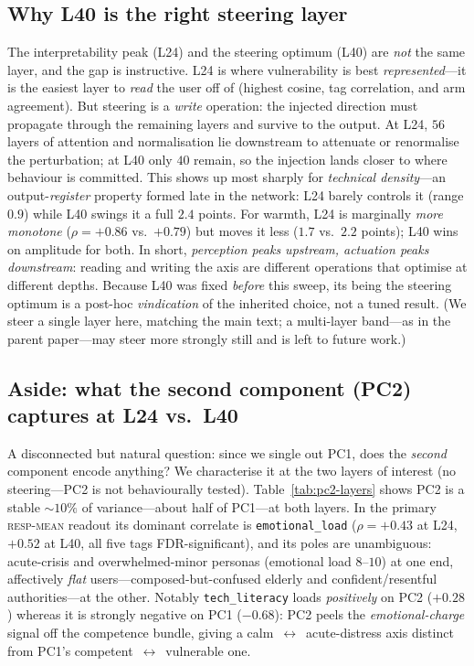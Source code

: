 \documentclass{article}
\newcommand{\respmean}{\textsc{resp-mean}}
\begin{document}
\subsection*{Why L40 is the right steering layer}
The interpretability peak (L24) and the steering optimum (L40) are \emph{not} the
same layer, and the gap is instructive. L24 is where vulnerability is best
\emph{represented}---it is the easiest layer to \emph{read} the user off of (highest
cosine, tag correlation, and arm agreement). But steering is a \emph{write}
operation: the injected direction must propagate through the remaining layers and
survive to the output. At L24, $56$ layers of attention and normalisation lie
downstream to attenuate or renormalise the perturbation; at L40 only $40$ remain, so
the injection lands closer to where behaviour is committed. This shows up most
sharply for \emph{technical density}---an output-\emph{register} property formed late
in the network: L24 barely controls it (range $0.9$) while L40 swings it a full
$2.4$ points. For warmth, L24 is marginally \emph{more monotone} ($\rho{=}{+}0.86$
vs.\ $+0.79$) but moves it less ($1.7$ vs.\ $2.2$ points); L40 wins on amplitude for
both. In short, \emph{perception peaks upstream, actuation peaks downstream}: reading
and writing the axis are different operations that optimise at different depths.
Because L40 was fixed \emph{before} this sweep, its being the steering optimum is a
post-hoc \emph{vindication} of the inherited choice, not a tuned result. (We steer a
single layer here, matching the main text; a multi-layer band---as in the parent
paper---may steer more strongly still and is left to future work.)

\subsection*{Aside: what the second component (PC2) captures at L24 vs.\ L40}
A disconnected but natural question: since we single out PC1, does the
\emph{second} component encode anything? We characterise it at the two layers of
interest (no steering---PC2 is not behaviourally tested).
Table~\ref{tab:pc2-layers} shows PC2 is a stable ${\sim}10\%$ of variance---about
half of PC1---at both layers. In the primary \respmean{} readout its dominant
correlate is \texttt{emotional\_load} ($\rho{=}{+}0.43$ at L24, $+0.52$ at L40, all
five tags FDR-significant), and its poles are unambiguous: acute-crisis and
overwhelmed-minor personas (emotional load $8$--$10$) at one end, affectively
\emph{flat} users---composed-but-confused elderly and confident/resentful
authorities---at the other. Notably \texttt{tech\_literacy} loads \emph{positively}
on PC2 ($+0.28$) whereas it is strongly negative on PC1 ($-0.68$): PC2 peels the
\emph{emotional-charge} signal off the competence bundle, giving a
calm~$\leftrightarrow$~acute-distress axis distinct from PC1's
competent~$\leftrightarrow$~vulnerable one.
\end{document}
